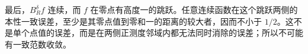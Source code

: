 \begin{solution}
最后，\(B_R^\delta f\) 连续，而 \(f\) 在零点有高度一的跳跃。任意连续函数在这个跳跃两侧的本性一致误差，至少是其零点值到零和一的距离的较大者，因而不小于 \(1/2\)。这不是单个点值的误差，而是在两侧正测度邻域内都无法同时消除的误差；所以不可能有一致范数收敛。
\end{solution}
